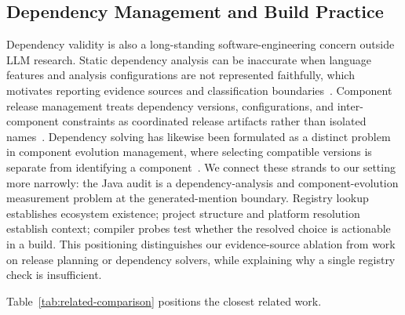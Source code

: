\documentclass[pdflatex,sn-basic]{sn-jnl}
\begin{document}
\subsection{Dependency Management and Build Practice}

Dependency validity is also a long-standing software-engineering concern outside LLM research. Static dependency analysis can be inaccurate when language features and analysis configurations are not represented faithfully, which motivates reporting evidence sources and classification boundaries~\citep{Pruijt2017DependencyAccuracy}. Component release management treats dependency versions, configurations, and inter-component constraints as coordinated release artifacts rather than isolated names~\citep{VanDerHoek2003ReleaseManagement}. Dependency solving has likewise been formulated as a distinct problem in component evolution management, where selecting compatible versions is separate from identifying a component~\citep{Abate2012DependencySolving}. We connect these strands to our setting more narrowly: the Java audit is a dependency-analysis and component-evolution measurement problem at the generated-mention boundary. Registry lookup establishes ecosystem existence; project structure and platform resolution establish context; compiler probes test whether the resolved choice is actionable in a build. This positioning distinguishes our evidence-source ablation from work on release planning or dependency solvers, while explaining why a single registry check is insufficient.

Table~\ref{tab:related-comparison} positions the closest related work.
\end{document}
